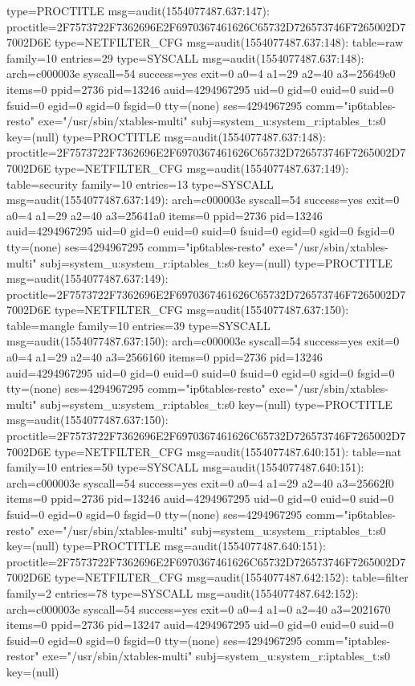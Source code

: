 \documentclass[]{report}
\newenvironment{Shaded}{}{}
\newcommand{\NormalTok}[1]{#1}
\begin{document}
\begin{Shaded}
\begin{Highlighting}[]
\NormalTok{type=PROCTITLE msg=audit(1554077487.637:147): proctitle=2F7573722F7362696E2F6970367461626C65732D726573746F7265002D77002D6E}
\NormalTok{type=NETFILTER_CFG msg=audit(1554077487.637:148): table=raw family=10 entries=29}
\NormalTok{type=SYSCALL msg=audit(1554077487.637:148): arch=c000003e syscall=54 success=yes exit=0 a0=4 a1=29 a2=40 a3=25649e0 items=0 ppid=2736 pid=13246 auid=4294967295 uid=0 gid=0 euid=0 suid=0 fsuid=0 egid=0 sgid=0 fsgid=0 tty=(none) ses=4294967295 comm="ip6tables-resto" exe="/usr/sbin/xtables-multi" subj=system_u:system_r:iptables_t:s0 key=(null)}
\NormalTok{type=PROCTITLE msg=audit(1554077487.637:148): proctitle=2F7573722F7362696E2F6970367461626C65732D726573746F7265002D77002D6E}
\NormalTok{type=NETFILTER_CFG msg=audit(1554077487.637:149): table=security family=10 entries=13}
\NormalTok{type=SYSCALL msg=audit(1554077487.637:149): arch=c000003e syscall=54 success=yes exit=0 a0=4 a1=29 a2=40 a3=25641a0 items=0 ppid=2736 pid=13246 auid=4294967295 uid=0 gid=0 euid=0 suid=0 fsuid=0 egid=0 sgid=0 fsgid=0 tty=(none) ses=4294967295 comm="ip6tables-resto" exe="/usr/sbin/xtables-multi" subj=system_u:system_r:iptables_t:s0 key=(null)}
\NormalTok{type=PROCTITLE msg=audit(1554077487.637:149): proctitle=2F7573722F7362696E2F6970367461626C65732D726573746F7265002D77002D6E}
\NormalTok{type=NETFILTER_CFG msg=audit(1554077487.637:150): table=mangle family=10 entries=39}
\NormalTok{type=SYSCALL msg=audit(1554077487.637:150): arch=c000003e syscall=54 success=yes exit=0 a0=4 a1=29 a2=40 a3=2566160 items=0 ppid=2736 pid=13246 auid=4294967295 uid=0 gid=0 euid=0 suid=0 fsuid=0 egid=0 sgid=0 fsgid=0 tty=(none) ses=4294967295 comm="ip6tables-resto" exe="/usr/sbin/xtables-multi" subj=system_u:system_r:iptables_t:s0 key=(null)}
\NormalTok{type=PROCTITLE msg=audit(1554077487.637:150): proctitle=2F7573722F7362696E2F6970367461626C65732D726573746F7265002D77002D6E}
\NormalTok{type=NETFILTER_CFG msg=audit(1554077487.640:151): table=nat family=10 entries=50}
\NormalTok{type=SYSCALL msg=audit(1554077487.640:151): arch=c000003e syscall=54 success=yes exit=0 a0=4 a1=29 a2=40 a3=25662f0 items=0 ppid=2736 pid=13246 auid=4294967295 uid=0 gid=0 euid=0 suid=0 fsuid=0 egid=0 sgid=0 fsgid=0 tty=(none) ses=4294967295 comm="ip6tables-resto" exe="/usr/sbin/xtables-multi" subj=system_u:system_r:iptables_t:s0 key=(null)}
\NormalTok{type=PROCTITLE msg=audit(1554077487.640:151): proctitle=2F7573722F7362696E2F6970367461626C65732D726573746F7265002D77002D6E}
\NormalTok{type=NETFILTER_CFG msg=audit(1554077487.642:152): table=filter family=2 entries=78}
\NormalTok{type=SYSCALL msg=audit(1554077487.642:152): arch=c000003e syscall=54 success=yes exit=0 a0=4 a1=0 a2=40 a3=2021670 items=0 ppid=2736 pid=13247 auid=4294967295 uid=0 gid=0 euid=0 suid=0 fsuid=0 egid=0 sgid=0 fsgid=0 tty=(none) ses=4294967295 comm="iptables-restor" exe="/usr/sbin/xtables-multi" subj=system_u:system_r:iptables_t:s0 key=(null)}

\end{Highlighting}
\end{Shaded}
\end{document}
